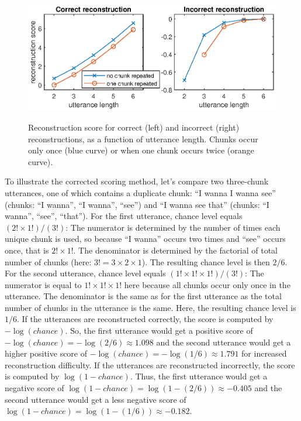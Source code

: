 \documentclass[man,mask,floatsintext]{apa6}
\begin{document}
\begin{figure}
{\centering \includegraphics[width=0.95\linewidth]{images/score.eps}}
\caption{Reconstruction score for correct (left) and incorrect (right) reconstructions, 
as a function of utterance length. Chunks occur only once (blue curve) or when one chunk 
occurs twice (orange curve).} \label{fig:score}
\end{figure}

To illustrate the corrected scoring method, let's compare two
three-chunk utterances, one of which contains a duplicate chunk:
\enquote{I wanna I wanna see} (chunks: \enquote{I wanna}, \enquote{I
wanna}, \enquote{see}) and \enquote{I wanna see that} (chunks:
\enquote{I wanna}, \enquote{see}, \enquote{that}). For the first
utterance, chance level equals \((2!\times1!)/(3!)\): The numerator is
determined by the number of times each unique chunk is used, so because
\enquote{I wanna} occurs two times and \enquote{see} occurs once, that
is \(2!\times1!\). The denominator is determined by the factorial of
total number of chunks (here: \(3! = 3\times2\times1\)). The resulting
chance level is then \(2/6\). For the second utterance, chance level
equals \((1!\times1!\times1!)/(3!)\): The numerator is equal to
\(1!\times1!\times1!\) here because all chunks occur only once in the
utterance. The denominator is the same as for the first utterance as the
total number of chunks in the utterance is the same. Here, the resulting
chance level is \(1/6\). If the utterances are reconstructed correctly,
the score is computed by \(-\log(chance)\). So, the first utterance
would get a positive score of
\(-\log(chance) = -\log(2/6) \approx 1.098\) and the second utterance
would get a higher positive score of
\(-\log(chance) = -\log(1/6) \approx 1.791\) for increased
reconstruction difficulty. If the utterances are reconstructed
incorrectly, the score is computed by \(\log(1-chance)\). Thus, the
first utterance would get a negative score of
\(\log(1-chance) = \log(1-(2/6)) \approx -0.405\) and the second
utterance would get a less negative score of
\(\log(1-chance) = \log(1-(1/6)) \approx -0.182\).
\end{document}
